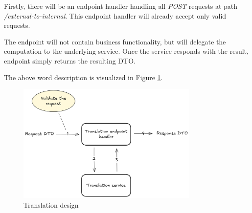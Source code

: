 \documentclass[../main.tex]{subfiles}
\begin{document}
Firstly, there will be an endpoint handler handling all \textit{POST} requests at path \textit{/external-to-internal}. This endpoint handler will already accept only valid requests.

The endpoint will not contain business functionality, but will delegate the computation to the underlying service. Once the service responds with the result, endpoint simply returns the resulting DTO.

The above word description is visualized in Figure \ref{fig:translation-design}.

\begin{figure}
  \begin{center}
    \includegraphics[width=0.8\textwidth]{images/translation-design.png}
  \end{center}
  \caption{Translation design}
  \label{fig:translation-design}
\end{figure}
\end{document}
